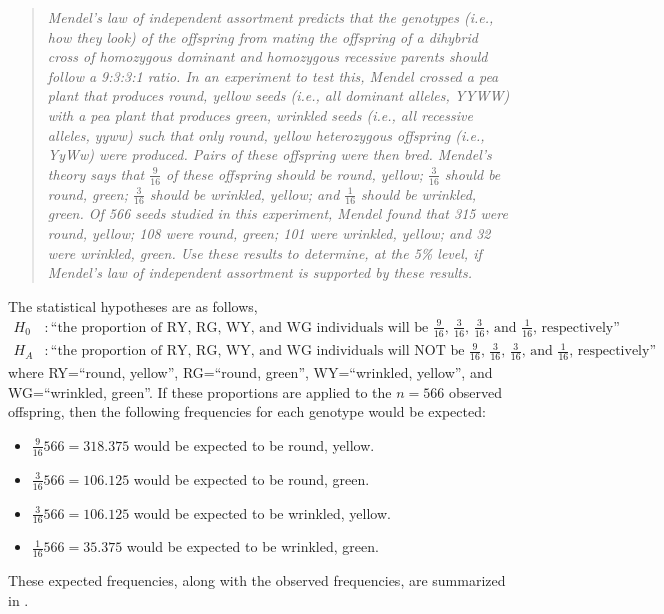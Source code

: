 \documentclass[10pt,openany]{book}\usepackage[]{graphicx}\usepackage[]{color}
\begin{document}
\begin{quote}
\textsl{Mendel's law of independent assortment predicts that the genotypes (i.e., how they look) of the offspring from mating the offspring of a dihybrid cross of homozygous dominant and homozygous recessive parents should follow a 9:3:3:1 ratio.  In an experiment to test this, Mendel crossed a pea plant that produces round, yellow seeds (i.e., all dominant alleles, YYWW) with a pea plant that produces green, wrinkled seeds (i.e., all recessive alleles, yyww) such that only round, yellow heterozygous offspring (i.e., YyWw) were produced.  Pairs of these offspring were then bred.  Mendel's theory says that $\frac{9}{16}$ of these offspring should be round, yellow; $\frac{3}{16}$ should be round, green; $\frac{3}{16}$ should be wrinkled, yellow; and $\frac{1}{16}$ should be wrinkled, green.  Of 566 seeds studied in this experiment, Mendel found that 315 were round, yellow; 108 were round, green; 101 were wrinkled, yellow; and 32 were wrinkled, green.  Use these results to determine, at the 5\% level, if Mendel's law of independent assortment is supported by these results.}
\end{quote}

The statistical hypotheses are as follows,
\[ \begin{split}
  H_{0}&: \text{``the proportion of RY, RG, WY, and WG individuals will be $\frac{9}{16}$, $\frac{3}{16}$, $\frac{3}{16}$, and $\frac{1}{16}$, respectively''} \\
  H_{A}&: \text{``the proportion of RY, RG, WY, and WG individuals will NOT be $\frac{9}{16}$, $\frac{3}{16}$, $\frac{3}{16}$, and $\frac{1}{16}$, respectively''}
\end{split} \]
where RY=``round, yellow'', RG=``round, green'', WY=``wrinkled, yellow'', and WG=``wrinkled, green''.  If these proportions are applied to the $n=566$ observed offspring, then the following frequencies for each genotype would be expected:
\begin{itemize}
  \item $\frac{9}{16}566 = 318.375$ would be expected to be round, yellow.
  \item $\frac{3}{16}566 = 106.125$ would be expected to be round, green.
  \item $\frac{3}{16}566 = 106.125$ would be expected to be wrinkled, yellow.
  \item $\frac{1}{16}566 = 35.375$ would be expected to be wrinkled, green.
\end{itemize}
These expected frequencies, along with the observed frequencies, are summarized in .
\end{document}
